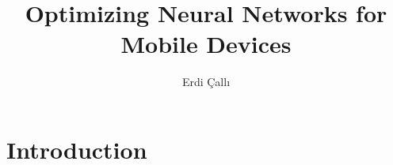 \documentclass[a4paper,man,natbib]{apa6}
\title{Optimizing Neural Networks for Mobile Devices}
\author{Erdi \c{C}all{\i}}
\affiliation{Radboud University Nijmegen, Neurant}
\begin{document}
\maketitle
\section{Introduction}


\end{document}
